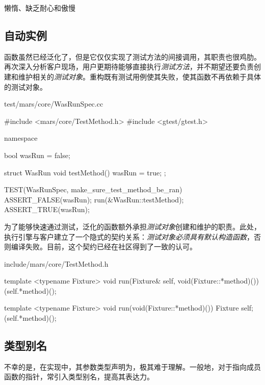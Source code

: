 \begin{content}
\begin{episode}{懒惰、缺乏耐心和傲慢}
\begin{content}
\end{content}
\end{episode}

\subsection{自动实例}

函数虽然已经泛化了，但是它仅仅实现了测试方法的间接调用，其职责也很鸡肋。再次深入分析客户现场，用户更期待能够直接执行\emph{测试方法}，并不期望还要负责创建和维护相关的\emph{测试对象}。重构既有测试用例使其失败，使其函数不再依赖于具体的测试对象。

\begin{nodiff}{test/mars/core/WasRunSpec.cc}
\begin{c++}
#include <mars/core/TestMethod.h>
#include <gtest/gtest.h>

namespace {
  bool wasRun = false;

  struct WasRun {
    void testMethod() {
      wasRun = true;
    }
  };
}

TEST(WasRunSpec, make_sure_test_method_be_ran) {
  ASSERT_FALSE(wasRun);
  run(&WasRun::testMethod);
  ASSERT_TRUE(wasRun);
}
\end{c++}
\end{nodiff}

为了能够快速通过测试，泛化的函数额外承担\emph{测试对象}创建和维护的职责。此处，执行引擎与客户建立了一个隐式的契约关系：\emph{测试对象必须具有默认构造函数}，否则编译失败。目前，这个契约已经在社区得到了一致的认可。

\begin{diff}{include/mars/core/TestMethod.h}
\begin{minicpp}
template <typename Fixture>
void run(Fixture& self, void(Fixture::*method)()) {
  (self.*method)();
}
\end{minicpp}
\tcblower
\begin{minicpp}
template <typename Fixture>
void run(void(Fixture::*method)()) {
  Fixture self;
  (self.*method)();
}
\end{minicpp}
\end{diff}

\subsection{类型别名}

不幸的是，在实现中，其参数类型声明为，极其难于理解。一般地，对于指向成员函数的指针，常引入类型别名，提高其表达力。


\end{content}

